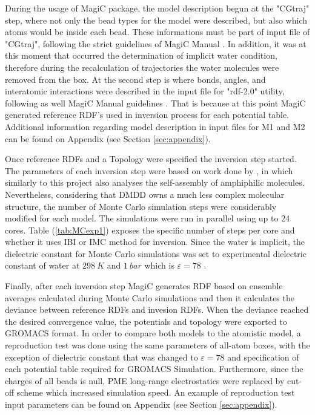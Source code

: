 \documentclass[10pt,a4paper,twoside]{article}
\begin{document}
 During the usage of MagiC package, the model description begun at the "CGtraj" step, where  not only the bead types for the model were described, but also which atoms would be inside each bead. These informations must be part of input file of "CGtraj", following the strict guidelines of MagiC Manual \cite{magicmanu}. In addition, it was at this moment that occurred the determination of implicit water condition, therefore during the recalculation of trajectories the water molecules were removed from the box. At the second step is where bonds, angles, and interatomic interactions were described in the input file for "rdf-2.0" utility, following as well MagiC Manual guidelines \cite{magicmanu}.  That is because at this point MagiC generated reference RDF's used in inversion process for each potential table. Additional information regarding model description in input files for M1 and M2 can be found on Appendix (see Section \ref{sec:appendix}).
 
 Once reference RDFs and a Topology were specified the inversion step started. The parameters of each inversion step were based on work done by , in which similarly to this project also analyses the self-assembly of amphiphilic molecules. Nevertheless, considering that DMDD owns a much less complex molecular structure, the number of Monte Carlo simulation steps were considerably modified for each model. The simulations were run in parallel using up to 24 cores. Table (\ref{tab:MCexp1}) exposes the specific number of steps per core and whether it uses IBI or IMC method for inversion. Since the water is implicit, the dielectric constant for Monte Carlo simulations was set to experimental dielectric constant of water at $298\ K$ and $1\ bar$ which is $\varepsilon = 78$ \cite{dconst}. 
 
 Finally, after each inversion step MagiC generates RDF based on ensemble averages calculated during Monte Carlo simulations and then it calculates the deviance between reference RDFs and invesion RDFs. When the deviance reached the desired convergence value, the potentials and topology were exported to GROMACS format. In order to compare both models to the atomistic model, a reproduction test was done using the same parameters of all-atom boxes, with the exception of dielectric constant that was changed to $\varepsilon = 78$ and specification of each potential table required for GROMACS Simulation. Furthermore, since the charges of all beads is null, PME long-range electrostatics were replaced by cut-off scheme which increased simulation speed. An example of reproduction test input parameters can be found on Appendix (see Section \ref{sec:appendix}).
\end{document}

